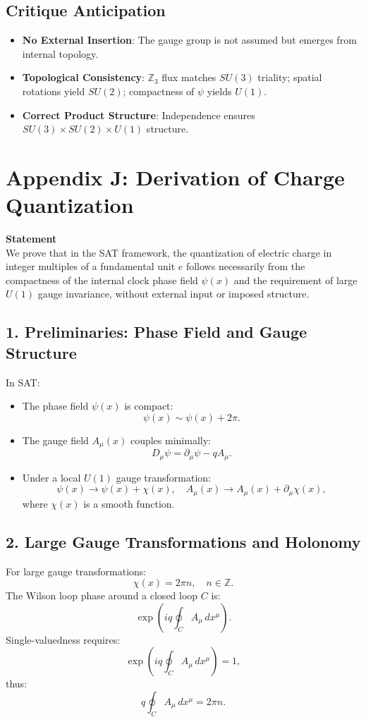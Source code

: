 \documentclass[12pt]{article}
\begin{document}
\subsection*{Critique Anticipation}
\begin{itemize}
    \item \textbf{No External Insertion}: The gauge group is not assumed but emerges from internal topology.
    \item \textbf{Topological Consistency}: \(\mathbb{Z}_3\) flux matches \(SU(3)\) triality; spatial rotations yield \(SU(2)\); compactness of \(\psi\) yields \(U(1)\).
    \item \textbf{Correct Product Structure}: Independence ensures \(SU(3) \times SU(2) \times U(1)\) structure.
\end{itemize}

\newpage
\section*{Appendix J: Derivation of Charge Quantization}

\textbf{Statement} \\
We prove that in the SAT framework, the quantization of electric charge in integer multiples of a fundamental unit \(e\) follows necessarily from the compactness of the internal clock phase field \(\psi(x)\) and the requirement of large \(U(1)\) gauge invariance, without external input or imposed structure.

\subsection*{1. Preliminaries: Phase Field and Gauge Structure}
In SAT:
\begin{itemize}
    \item The phase field \(\psi(x)\) is compact:
    \[
    \psi(x) \sim \psi(x) + 2\pi.
    \]
    \item The gauge field \(A_\mu(x)\) couples minimally:
    \[
    D_\mu \psi = \partial_\mu \psi - q A_\mu.
    \]
    \item Under a local \(U(1)\) gauge transformation:
    \[
    \psi(x) \to \psi(x) + \chi(x), \quad A_\mu(x) \to A_\mu(x) + \partial_\mu \chi(x),
    \]
    where \(\chi(x)\) is a smooth function.
\end{itemize}

\subsection*{2. Large Gauge Transformations and Holonomy}
For large gauge transformations:
\[
\chi(x) = 2\pi n, \quad n \in \mathbb{Z}.
\]
The Wilson loop phase around a closed loop \(C\) is:
\[
\exp\left( i q \oint_C A_\mu \, dx^\mu \right).
\]
Single-valuedness requires:
\[
\exp\left( i q \oint_C A_\mu \, dx^\mu \right) = 1,
\]
thus:
\[
q \oint_C A_\mu \, dx^\mu = 2\pi n.
\]
\end{document}
